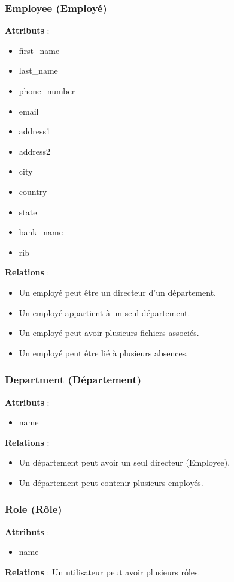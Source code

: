 \subsubsection{Employee (Employé)}
\textbf{Attributs} :
\begin{itemize}
    \item first\_name
    \item last\_name
    \item phone\_number
    \item email
    \item address1
    \item address2
    \item city
    \item country
    \item state
    \item bank\_name
    \item rib
\end{itemize}
\textbf{Relations} :
\begin{itemize}
    \item Un employé peut être un directeur d'un département.
    \item Un employé appartient à un seul département.
    \item Un employé peut avoir plusieurs fichiers associés.
    \item Un employé peut être lié à plusieurs absences.
\end{itemize}

\subsubsection{Department (Département)}
\textbf{Attributs} :
\begin{itemize}
    \item name
\end{itemize}
\textbf{Relations} :
\begin{itemize}
    \item Un département peut avoir un seul directeur (Employee).
    \item Un département peut contenir plusieurs employés.
\end{itemize}

\subsubsection{Role (Rôle)}
\textbf{Attributs} :
\begin{itemize}
    \item name
\end{itemize}
\textbf{Relations} : Un utilisateur peut avoir plusieurs rôles.

